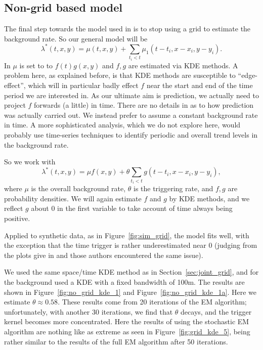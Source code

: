 \documentclass[twoside,a4paper]{article}
\theoremstyle{plain}
\theoremstyle{definition}
\begin{document}
\subsection{Non-grid based model}\label{sec:no_grid_kde}

The final step towards the model used in \cite{sepp2} is to stop using a grid to estimate
the background rate.  So our general model will be
\[ \lambda^*(t,x,y) = \mu(t,x,y) + \sum_{t_i < t} \mu_1(t-t_i, x-x_i, y-y_i). \]
In \cite{sepp2} $\mu$ is set to to $f(t)g(x,y)$ and $f,g$ are estimated via KDE methods.
A problem here, as explained before, is that KDE methods are susceptible to ``edge-effect'',
which will in particular badly effect $f$ near the start and end of the time period we are
interested in.  As our ultimate aim is prediction, we actually need to project $f$ forwards
(a little) in time.  There are no details in \cite{sepp2} as to how prediction was actually
carried out.  We instead prefer to assume a constant background rate in time.
A more sophisticated analysis, which we do not explore here, would probably use time-series
techniques to identify periodic and overall trend levels in the background rate.

So we work with
\[ \lambda^*(t,x,y) = \mu f(x,y) + \theta \sum_{t_i < t} g(t-t_i, x-x_i, y-y_i), \]
where $\mu$ is the overall background rate, $\theta$ is the triggering rate, and $f,g$
are probability densities.  We will again estimate $f$ and $g$ by KDE methods, and we
reflect $g$ about $0$ in the first variable to take account of time always being positive.

Applied to synthetic data, as in Figure~\ref{fig:sim_grid}, the model fits well, with the
exception that the time trigger is rather underestimated near $0$ (judging from the plots give in
\cite{sepp} and \cite{rc} those authors encountered the same issue).  

We used the same space/time KDE method as in Section~\ref{sec:joint_grid}, and for the background
used a KDE with a fixed bandwidth of 100m.  The results are shown in Figure~\ref{fig:no_grid_kde_1}
and Figure~\ref{fig:no_grid_kde_1a}.  Here we estimate $\theta\approx 0.58$.  These results
come from 20 iterations of the EM algorithm; unfortunately, with another 30 iterations,
we find that $\theta$ decays, and the trigger kernel becomes more concentrated.
Here the results of using the stochastic EM algorithm are nothing like as extreme as
seen in Figure~\ref{fig:grid_kde_5}, being rather similar to the results of the full EM
algorithm after 50 iterations.
\end{document}
